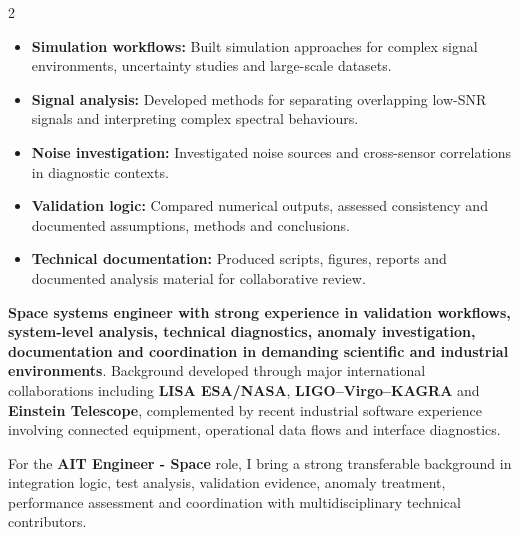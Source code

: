 \documentclass[8pt,a4paper,ragged2e,withhyper]{altacv}
\begin{document}
\begin{paracol}{2}
\begin{itemize}
  \item \textbf{Simulation workflows:} Built simulation approaches for complex signal environments, uncertainty studies and large-scale datasets.
  \item \textbf{Signal analysis:} Developed methods for separating overlapping low-SNR signals and interpreting complex spectral behaviours.
  \item \textbf{Noise investigation:} Investigated noise sources and cross-sensor correlations in diagnostic contexts.
  \item \textbf{Validation logic:} Compared numerical outputs, assessed consistency and documented assumptions, methods and conclusions.
  \item \textbf{Technical documentation:} Produced scripts, figures, reports and documented analysis material for collaborative review.
\end{itemize}

\switchcolumn


\textbf{Space systems engineer with strong experience in validation workflows, system-level analysis, technical diagnostics, anomaly investigation, documentation and coordination in demanding scientific and industrial environments}. Background developed through major international collaborations including \textbf{LISA ESA/NASA}, \textbf{LIGO--Virgo--KAGRA} and \textbf{Einstein Telescope}, complemented by recent industrial software experience involving connected equipment, operational data flows and interface diagnostics.

For the \textbf{AIT Engineer - Space} role, I bring a strong transferable background in integration logic, test analysis, validation evidence, anomaly treatment, performance assessment and coordination with multidisciplinary technical contributors.


\end{paracol}
\end{document}
